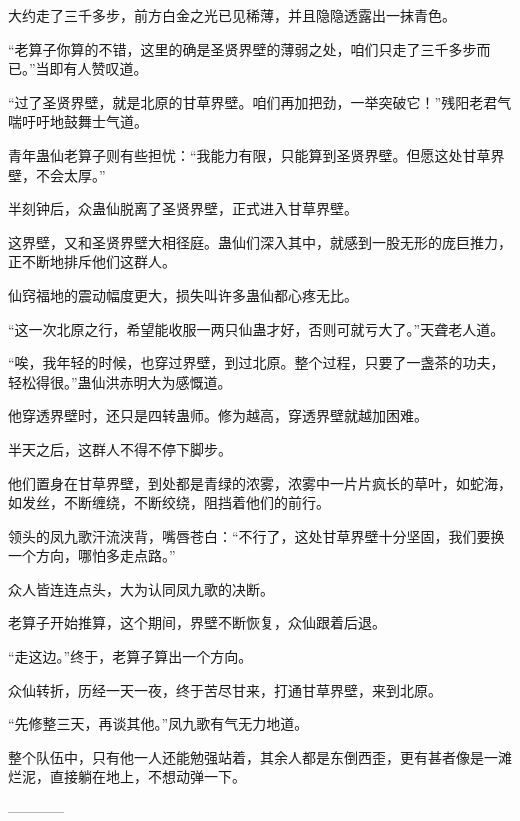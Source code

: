 \begin{this_body}
大约走了三千多步，前方白金之光已见稀薄，并且隐隐透露出一抹青色。

“老算子你算的不错，这里的确是圣贤界壁的薄弱之处，咱们只走了三千多步而已。”当即有人赞叹道。

“过了圣贤界壁，就是北原的甘草界壁。咱们再加把劲，一举突破它！”残阳老君气喘吁吁地鼓舞士气道。

青年蛊仙老算子则有些担忧：“我能力有限，只能算到圣贤界壁。但愿这处甘草界壁，不会太厚。”

半刻钟后，众蛊仙脱离了圣贤界壁，正式进入甘草界壁。

这界壁，又和圣贤界壁大相径庭。蛊仙们深入其中，就感到一股无形的庞巨推力，正不断地排斥他们这群人。

仙窍福地的震动幅度更大，损失叫许多蛊仙都心疼无比。

“这一次北原之行，希望能收服一两只仙蛊才好，否则可就亏大了。”天聋老人道。

“唉，我年轻的时候，也穿过界壁，到过北原。整个过程，只要了一盏茶的功夫，轻松得很。”蛊仙洪赤明大为感慨道。

他穿透界壁时，还只是四转蛊师。修为越高，穿透界壁就越加困难。

半天之后，这群人不得不停下脚步。

他们置身在甘草界壁，到处都是青绿的浓雾，浓雾中一片片疯长的草叶，如蛇海，如发丝，不断缠绕，不断绞绕，阻挡着他们的前行。

领头的凤九歌汗流浃背，嘴唇苍白：“不行了，这处甘草界壁十分坚固，我们要换一个方向，哪怕多走点路。”

众人皆连连点头，大为认同凤九歌的决断。

老算子开始推算，这个期间，界壁不断恢复，众仙跟着后退。

“走这边。”终于，老算子算出一个方向。

众仙转折，历经一天一夜，终于苦尽甘来，打通甘草界壁，来到北原。

“先修整三天，再谈其他。”凤九歌有气无力地道。

整个队伍中，只有他一人还能勉强站着，其余人都是东倒西歪，更有甚者像是一滩烂泥，直接躺在地上，不想动弹一下。

------------

\end{this_body}

